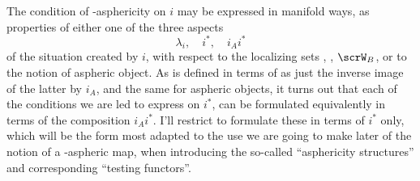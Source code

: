 The condition of \scrW-asphericity on $i$ may be expressed in manifold
ways, as properties of either one of the three aspects
\[\lambda_i, \quad i^*, \quad i_Ai^*\]
of the situation created by $i$, with respect to the localizing sets
\scrW, \scrWA, $\scrW_B$, or to the notion of aspheric object. As
\scrWA{} is defined in terms of \scrW{} as just the inverse image of
the latter by $i_A$, and the same for aspheric objects, it turns out
that each of the conditions we are led to express on
$i^*$, can be formulated equivalently in terms of the composition
$i_Ai^*$. I'll restrict to formulate these in terms of $i^*$ only,
which will be the form most adapted to the use we are going to make
later of the notion of a \scrW-aspheric map, when introducing the
so-called ``asphericity structures'' and corresponding ``testing
functors''.

\bigbreak
\presectionfill{}\par

